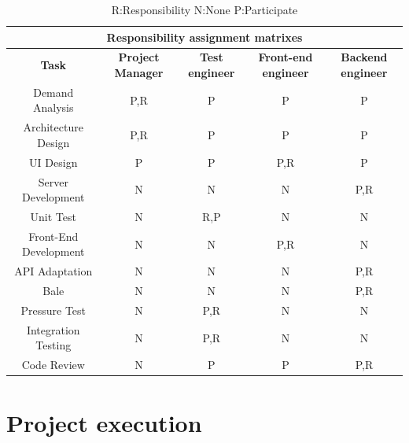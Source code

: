 \documentclass[runningheads]{llncs}
\begin{document}
\begin{table}
\centering
\begin{tabular}{|c|c|c|c|c|}
\hline
\multicolumn{5}{|c|}{\textbf{Responsibility assignment matrixes}}\\ %
\hline
\textbf{Task}&\textbf{Project Manager}&\textbf{Test engineer}&\textbf{Front-end engineer}&\textbf{Backend engineer}\\
\hline
Demand Analysis&P,R&P&P&P\\
\hline
Architecture Design&P,R&P&P&P\\
\hline
UI Design&P&P&P,R&P\\
\hline
Server Development&N&N&N&P,R\\
\hline
Unit Test&N&R,P&N&N\\
\hline
Front-End Development&N&N&P,R&N\\
\hline
API Adaptation&N&N&N&P,R\\
\hline
Bale&N&N&N&P,R\\
\hline
Pressure Test&N&P,R&N&N\\
\hline
Integration Testing&N&P,R&N&N\\
\hline
Code Review&N&P&P&P,R\\
\hline

\end{tabular}
\caption{R:Responsibility  N:None  P:Participate}
\end{table}

\section{Project execution}
\end{document}
